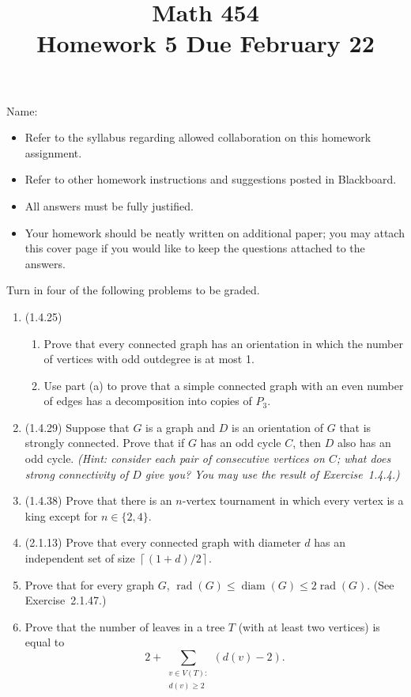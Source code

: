 \documentclass[11pt]{amsart}%
\newcommand{\ceil}[1]{\left\lceil#1\right\rceil}
\DeclareMathOperator{\rad}{rad}
\DeclareMathOperator{\diam}{diam}
\begin{document}
\title{Math 454\\ Homework 5 \qquad Due February 22}
\author{}
\date{}
\maketitle
\thispagestyle{empty}

\noindent Name:~\hrulefill~~\\

\begin{itemize}
\item Refer to the syllabus regarding allowed collaboration on this homework assignment.
\item Refer to other homework instructions and suggestions posted in Blackboard.
\item All answers must be fully justified.
\item Your homework should be neatly written on additional paper; you may attach this cover page if you would like to keep the questions attached to the answers.
\end{itemize}

\bigskip
Turn in four of the following problems to be graded.
\bigskip

\begin{enumerate}
\item (1.4.25) 
\begin{enumerate}
\item Prove that every connected graph has an orientation in which the number of vertices with odd outdegree is at most 1.
\item Use part (a) to prove that a simple connected graph with an even number of edges has a decomposition into copies of $P_3$.
\end{enumerate}

\item (1.4.29) Suppose that $G$ is a graph and $D$ is an orientation of $G$ that is strongly connected.  Prove that if $G$ has an odd cycle $C$, then $D$ also has an odd cycle.  \textit{(Hint: consider each pair of consecutive vertices on $C$; what does strong connectivity of $D$ give you?  You may use the result of Exercise~1.4.4.)}

\item (1.4.38) Prove that there is an $n$-vertex tournament in which every vertex is a king except for $n\in\{2,4\}$.


\item (2.1.13) Prove that every connected graph with diameter $d$ has an independent set of size $\ceil{(1+d)/2}$.

\item Prove that for every graph $G$, $\rad(G)\leq\diam(G)\leq2\rad(G)$.  (See Exercise~2.1.47.)

\item Prove that the number of leaves in a tree $T$ (with at least two vertices) is equal to \[ 2+\sum_{\substack{v\in V(T):\\d(v)\geq2}} (d(v)-2). \]

\end{enumerate}
\end{document}
